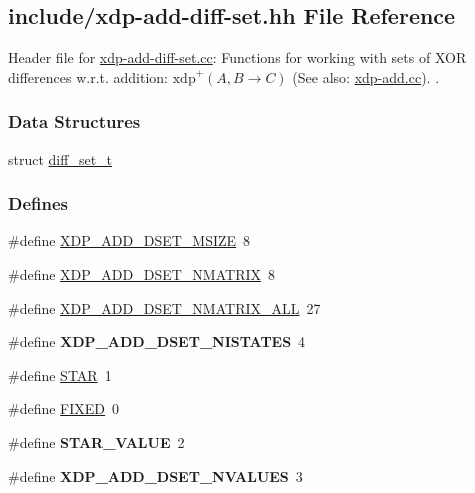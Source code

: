\hypertarget{xdp-add-diff-set_8hh}{\subsection{include/xdp-\/add-\/diff-\/set.hh \-File \-Reference}
\label{xdp-add-diff-set_8hh}
}


\-Header file for \hyperlink{xdp-add-diff-set_8cc}{xdp-\/add-\/diff-\/set.\-cc}\-: \-Functions for working with sets of \-X\-O\-R differences w.\-r.\-t. addition\-: $\mathrm{xdp}^{+}(A,B \rightarrow C)$ (\-See also\-: \hyperlink{xdp-add_8cc}{xdp-\/add.\-cc}). .  


\subsubsection*{\-Data \-Structures}
\begin{DoxyCompactItemize}
\item 
struct \hyperlink{structdiff__set__t}{diff\-\_\-set\-\_\-t}
\end{DoxyCompactItemize}
\subsubsection*{\-Defines}
\begin{DoxyCompactItemize}
\item 
\#define \hyperlink{xdp-add-diff-set_8hh_aa108899befe543f21add3d4ded7874c1}{\-X\-D\-P\-\_\-\-A\-D\-D\-\_\-\-D\-S\-E\-T\-\_\-\-M\-S\-I\-Z\-E}~8
\item 
\#define \hyperlink{xdp-add-diff-set_8hh_a203708980471057a5a791dcf1e57514f}{\-X\-D\-P\-\_\-\-A\-D\-D\-\_\-\-D\-S\-E\-T\-\_\-\-N\-M\-A\-T\-R\-I\-X}~8
\item 
\#define \hyperlink{xdp-add-diff-set_8hh_a2604e06c34675d9ea893b5a84c55b61f}{\-X\-D\-P\-\_\-\-A\-D\-D\-\_\-\-D\-S\-E\-T\-\_\-\-N\-M\-A\-T\-R\-I\-X\-\_\-\-A\-L\-L}~27
\item 
\hypertarget{xdp-add-diff-set_8hh_a1dfd47415ba44ccb31f304f51e482f94}{\#define {\bfseries \-X\-D\-P\-\_\-\-A\-D\-D\-\_\-\-D\-S\-E\-T\-\_\-\-N\-I\-S\-T\-A\-T\-E\-S}~4}\label{xdp-add-diff-set_8hh_a1dfd47415ba44ccb31f304f51e482f94}

\item 
\#define \hyperlink{xdp-add-diff-set_8hh_a94c3dc9846edbbb70f678768633a4796}{\-S\-T\-A\-R}~1
\item 
\#define \hyperlink{xdp-add-diff-set_8hh_a20207ffc8e6f0bdcefb5c42a5b5c3fb8}{\-F\-I\-X\-E\-D}~0
\item 
\hypertarget{xdp-add-diff-set_8hh_aa65554cf4a1efb73d7b8abc7628289ac}{\#define {\bfseries \-S\-T\-A\-R\-\_\-\-V\-A\-L\-U\-E}~2}\label{xdp-add-diff-set_8hh_aa65554cf4a1efb73d7b8abc7628289ac}

\item 
\hypertarget{xdp-add-diff-set_8hh_aaf4bc4ed388cb2af7832429433d34921}{\#define {\bfseries \-X\-D\-P\-\_\-\-A\-D\-D\-\_\-\-D\-S\-E\-T\-\_\-\-N\-V\-A\-L\-U\-E\-S}~3}\label{xdp-add-diff-set_8hh_aaf4bc4ed388cb2af7832429433d34921}

\end{DoxyCompactItemize}
